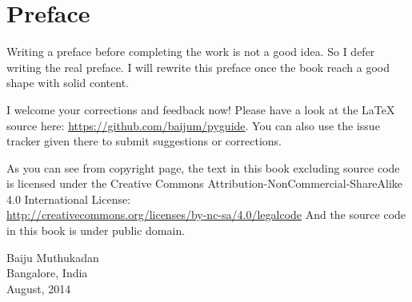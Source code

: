 \cleardoublepage
{}
{}
\chapter*{Preface}

Writing a preface before completing the work is not a good idea.  So I
defer writing the real preface.  I will rewrite this preface once the
book reach a good shape with solid content.

I welcome your corrections and feedback now!  Please have a look at
the \LaTeX{} source here: \url{https://github.com/baijum/pyguide}.  You
can also use the issue tracker given there to submit suggestions or
corrections.

As you can see from copyright page, the text in this book excluding
source code is licensed under the Creative Commons
Attribution-NonCommercial-ShareAlike 4.0
International License:\\
\url{http://creativecommons.org/licenses/by-nc-sa/4.0/legalcode} And
the source code in this book is under public domain.

\vspace*{.5in}
Baiju Muthukadan\\
Bangalore, India\\August, 2014
